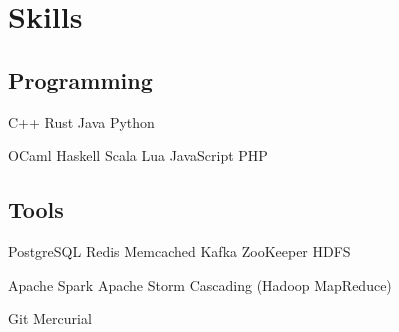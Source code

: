 \documentclass[]{resume}
\begin{document}
\begin{minipage}[t]{0.33\textwidth}
\sectionsep


\section{Skills}

\subsection{Programming}

C++ \textbullet{} Rust \textbullet{} Java \textbullet{} Python

OCaml \textbullet{} Haskell \textbullet{} Scala \textbullet{} Lua \textbullet{} JavaScript \textbullet{} PHP

\sectionsep

\subsection{Tools}

PostgreSQL \textbullet{} Redis \textbullet{} Memcached
\textbullet{} Kafka \textbullet{} ZooKeeper \textbullet{} HDFS

Apache Spark \textbullet{} Apache Storm \textbullet{} Cascading (Hadoop MapReduce)

Git \textbullet{} Mercurial

\sectionsep

%
%

\end{minipage}
\hfill
\end{document}
